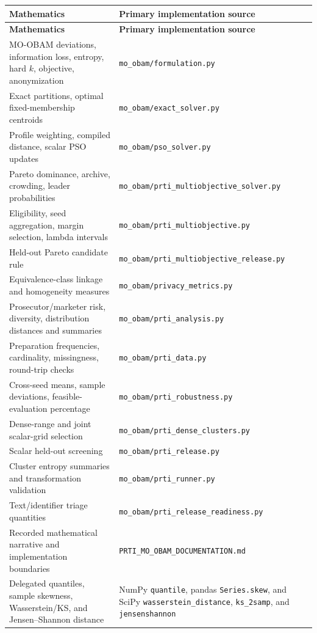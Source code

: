 \documentclass[11pt,a4paper]{article}
\newcommand{\code}[1]{\texttt{#1}}
\begin{document}
\begin{longtable}{@{}L{0.40\textwidth}L{0.54\textwidth}@{}}
\toprule
\textbf{Mathematics} & \textbf{Primary implementation source}\\
\midrule
\endfirsthead
\toprule
\textbf{Mathematics} & \textbf{Primary implementation source}\\
\midrule
\endhead
MO-OBAM deviations, information loss, entropy, hard $k$, objective, anonymization
& \code{mo\_obam/formulation.py}\\
Exact partitions, optimal fixed-membership centroids
& \code{mo\_obam/exact\_solver.py}\\
Profile weighting, compiled distance, scalar PSO updates
& \code{mo\_obam/pso\_solver.py}\\
Pareto dominance, archive, crowding, leader probabilities
& \code{mo\_obam/prti\_multiobjective\_solver.py}\\
Eligibility, seed aggregation, margin selection, lambda intervals
& \code{mo\_obam/prti\_multiobjective.py}\\
Held-out Pareto candidate rule
& \code{mo\_obam/prti\_multiobjective\_release.py}\\
Equivalence-class linkage and homogeneity measures
& \code{mo\_obam/privacy\_metrics.py}\\
Prosecutor/marketer risk, diversity, distribution distances and summaries
& \code{mo\_obam/prti\_analysis.py}\\
Preparation frequencies, cardinality, missingness, round-trip checks
& \code{mo\_obam/prti\_data.py}\\
Cross-seed means, sample deviations, feasible-evaluation percentage
& \code{mo\_obam/prti\_robustness.py}\\
Dense-range and joint scalar-grid selection
& \code{mo\_obam/prti\_dense\_clusters.py}\\
Scalar held-out screening
& \code{mo\_obam/prti\_release.py}\\
Cluster entropy summaries and transformation validation
& \code{mo\_obam/prti\_runner.py}\\
Text/identifier triage quantities
& \code{mo\_obam/prti\_release\_readiness.py}\\
Recorded mathematical narrative and implementation boundaries
& \code{PRTI\_MO\_OBAM\_DOCUMENTATION.md}\\
Delegated quantiles, sample skewness, Wasserstein/KS, and Jensen--Shannon distance
& NumPy \code{quantile}, pandas \code{Series.skew}, and SciPy
  \code{wasserstein\_distance}, \code{ks\_2samp}, and \code{jensenshannon}\\
\bottomrule
\end{longtable}
\end{document}
